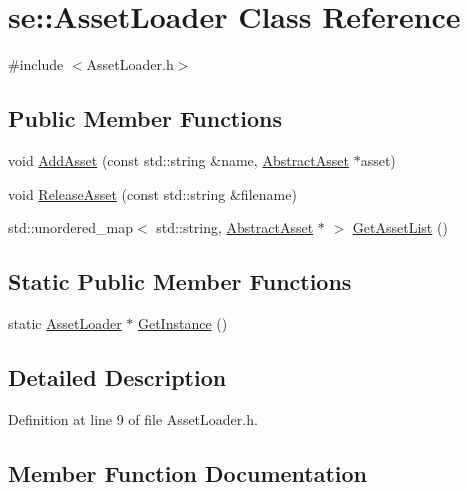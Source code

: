 \hypertarget{classse_1_1_asset_loader}{}\section{se\+:\+:Asset\+Loader Class Reference}
\label{classse_1_1_asset_loader}


{\ttfamily \#include $<$Asset\+Loader.\+h$>$}

\subsection*{Public Member Functions}
\begin{DoxyCompactItemize}
\item 
void \mbox{\hyperlink{classse_1_1_asset_loader_af502b0fee380cbc242433b7489d40556}{Add\+Asset}} (const std\+::string \&name, \mbox{\hyperlink{classse_1_1_abstract_asset}{Abstract\+Asset}} $\ast$asset)
\item 
void \mbox{\hyperlink{classse_1_1_asset_loader_a2a026ba0e30f88b0c710ca719e9f6af0}{Release\+Asset}} (const std\+::string \&filename)
\item 
std\+::unordered\+\_\+map$<$ std\+::string, \mbox{\hyperlink{classse_1_1_abstract_asset}{Abstract\+Asset}} $\ast$ $>$ \mbox{\hyperlink{classse_1_1_asset_loader_af6cb24e98780a9e9196b051044de41d8}{Get\+Asset\+List}} ()
\end{DoxyCompactItemize}
\subsection*{Static Public Member Functions}
\begin{DoxyCompactItemize}
\item 
static \mbox{\hyperlink{classse_1_1_asset_loader}{Asset\+Loader}} $\ast$ \mbox{\hyperlink{classse_1_1_asset_loader_adb388965562391024b67dba4c2da2b9a}{Get\+Instance}} ()
\end{DoxyCompactItemize}


\subsection{Detailed Description}


Definition at line 9 of file Asset\+Loader.\+h.



\subsection{Member Function Documentation}
\mbox{\label{classse_1_1_asset_loader_af502b0fee380cbc242433b7489d40556}} 
